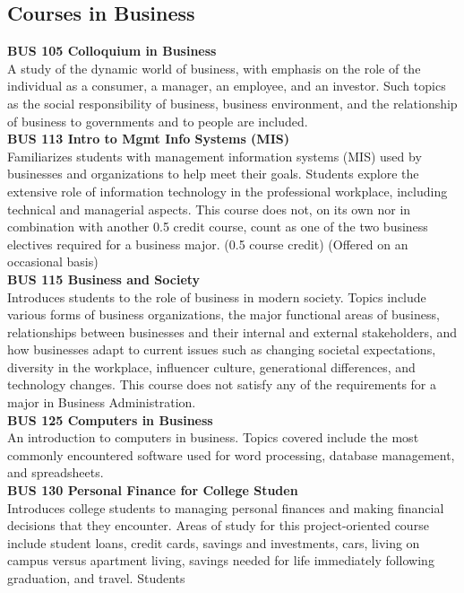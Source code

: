 \documentclass[
  letterpaper,
]{scrbook}
\begin{document}
\subsection{Courses in Business}\label{courses-in-business}

\textbf{BUS 105 Colloquium in Business}\\
A study of the dynamic world of business, with emphasis on the role of
the individual as a consumer, a manager, an employee, and an investor.
Such topics as the social responsibility of business, business
environment, and the relationship of business to governments and to
people are included.\\
\textbf{BUS 113 Intro to Mgmt Info Systems (MIS)}\\
Familiarizes students with management information systems (MIS) used by
businesses and organizations to help meet their goals. Students explore
the extensive role of information technology in the professional
workplace, including technical and managerial aspects. This course does
not, on its own nor in combination with another 0.5 credit course, count
as one of the two business electives required for a business major. (0.5
course credit) (Offered on an occasional basis)\\
\textbf{BUS 115 Business and Society}\\
Introduces students to the role of business in modern society. Topics
include various forms of business organizations, the major functional
areas of business, relationships between businesses and their internal
and external stakeholders, and how businesses adapt to current issues
such as changing societal expectations, diversity in the workplace,
influencer culture, generational differences, and technology changes.
This course does not satisfy any of the requirements for a major in
Business Administration.\\
\textbf{BUS 125 Computers in Business}\\
An introduction to computers in business. Topics covered include the
most commonly encountered software used for word processing, database
management, and spreadsheets.\\
\textbf{BUS 130 Personal Finance for College Studen}\\
Introduces college students to managing personal finances and making
financial decisions that they encounter. Areas of study for this
project-oriented course include student loans, credit cards, savings and
investments, cars, living on campus versus apartment living, savings
needed for life immediately following graduation, and travel. Students
\end{document}
